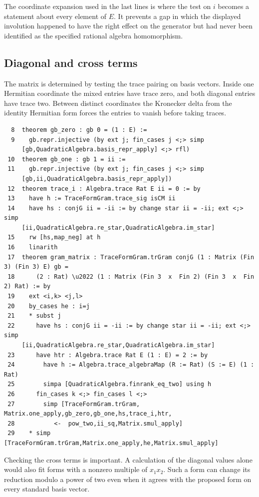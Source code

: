 \documentclass[12pt,letterpaper]{article}
\begin{document}
The coordinate expansion used in the last lines is where the test on $i$ becomes a statement about every element of $E$. It prevents a gap in which the displayed involution happened to have the right effect on the generator but had never been identified as the specified rational algebra homomorphism.
\clearpage{}\subsection*{Diagonal and cross terms}
The matrix is determined by testing the trace pairing on basis vectors. Inside one Hermitian coordinate the mixed entries have trace zero, and both diagonal entries have trace two. Between distinct coordinates the Kronecker delta from the identity Hermitian form forces the entries to vanish before taking traces.
\par
{\fontsize{8.8}{10.5}\selectfont\begin{verbatim}
  8  theorem gb_zero : gb 0 = (1 : E) :=
  9    gb.repr.injective (by ext j; fin_cases j <;> simp
     [gb,QuadraticAlgebra.basis_repr_apply] <;> rfl)
 10  theorem gb_one : gb 1 = ii :=
 11    gb.repr.injective (by ext j; fin_cases j <;> simp
     [gb,ii,QuadraticAlgebra.basis_repr_apply])
 12  theorem trace_i : Algebra.trace Rat E ii = 0 := by
 13    have h := TraceFormGram.trace_sig isCM ii
 14    have hs : conjG ii = -ii := by change star ii = -ii; ext <;> simp
     [ii,QuadraticAlgebra.re_star,QuadraticAlgebra.im_star]
 15    rw [hs,map_neg] at h
 16    linarith
 17  theorem gram_matrix : TraceFormGram.trGram conjG (1 : Matrix (Fin 3) (Fin 3) E) gb =
 18      (2 : Rat) \u2022 (1 : Matrix (Fin 3  x  Fin 2) (Fin 3  x  Fin 2) Rat) := by
 19    ext <i,k> <j,l>
 20    by_cases he : i=j
 21    * subst j
 22      have hs : conjG ii = -ii := by change star ii = -ii; ext <;> simp
     [ii,QuadraticAlgebra.re_star,QuadraticAlgebra.im_star]
 23      have htr : Algebra.trace Rat E (1 : E) = 2 := by
 24        have h := Algebra.trace_algebraMap (R := Rat) (S := E) (1 : Rat)
 25        simpa [QuadraticAlgebra.finrank_eq_two] using h
 26      fin_cases k <;> fin_cases l <;>
 27        simp [TraceFormGram.trGram, Matrix.one_apply,gb_zero,gb_one,hs,trace_i,htr,
 28           <-  pow_two,ii_sq,Matrix.smul_apply]
 29    * simp [TraceFormGram.trGram,Matrix.one_apply,he,Matrix.smul_apply]
\end{verbatim}}
Checking the cross terms is important. A calculation of the diagonal values alone would also fit forms with a nonzero multiple of $x_1x_2$. Such a form can change its reduction modulo a power of two even when it agrees with the proposed form on every standard basis vector.
\end{document}
